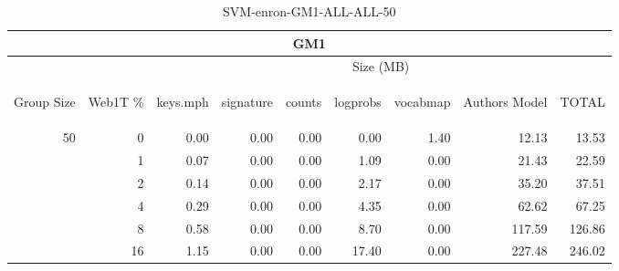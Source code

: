 \begin{center}
\begin{table}[htbp] 
 \begin{center}
\begin{tabular}{ | r | r | r | r | r | r | r | r | r |}
\hline
\multicolumn{9}{|c|}{GM1}\\
\hline
 & & \multicolumn{7}{|c|}{Size (MB)}\\ \cline{3-9}
\begin{sideways}Group Size\end{sideways} & \begin{sideways}Web1T \% \end{sideways} & \begin{sideways}keys.mph\end{sideways} & \begin{sideways}signature\end{sideways} & \begin{sideways}counts\end{sideways} & \begin{sideways}logprobs\end{sideways} & \begin{sideways}vocabmap\end{sideways} & \begin{sideways}Authors Model \end{sideways} & \begin{sideways}TOTAL\end{sideways}\\
\hline
\multirow{5}{*}{50}
 & 0 & 0.00 & 0.00 & 0.00 & 0.00 & 1.40 & 12.13 & 13.53\\ \cline{2-9}
 & 1 & 0.07 & 0.00 & 0.00 & 1.09 & 0.00 & 21.43 & 22.59\\ \cline{2-9}
 & 2 & 0.14 & 0.00 & 0.00 & 2.17 & 0.00 & 35.20 & 37.51\\ \cline{2-9}
 & 4 & 0.29 & 0.00 & 0.00 & 4.35 & 0.00 & 62.62 & 67.25\\ \cline{2-9}
 & 8 & 0.58 & 0.00 & 0.00 & 8.70 & 0.00 & 117.59 & 126.86\\ \cline{2-9}
 & 16 & 1.15 & 0.00 & 0.00 & 17.40 & 0.00 & 227.48 & 246.02\\ \cline{2-9}
\hline
\end{tabular}
\caption{SVM-enron-GM1-ALL-ALL-50}
\label{table:SVM-enron-GM1-ALL-ALL-50}
\end{center}
 \end{table}
\end{center}

